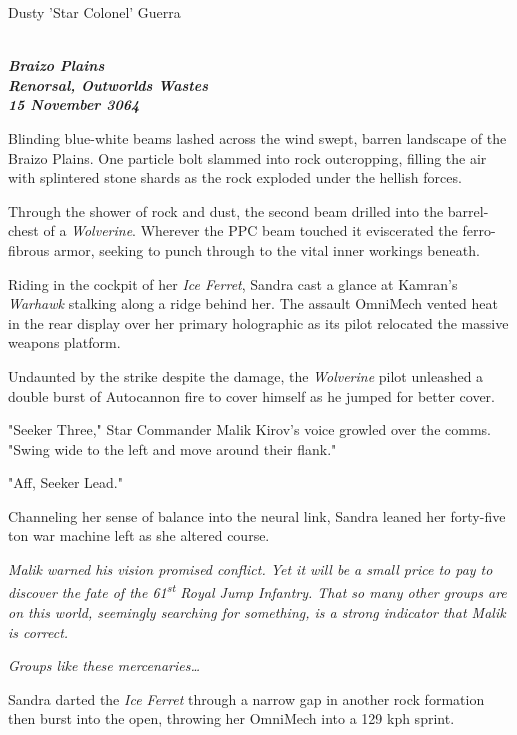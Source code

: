 \begin{center}
Dusty 'Star Colonel' Guerra
\end{center}

\begin{multicols}{2}

\emph{
\bfseries
\\Braizo Plains\\
\noindent
Renorsal, Outworlds Wastes\\
15 November 3064
}

Blinding blue-white beams lashed across the wind swept, barren landscape of the Braizo Plains.
One particle bolt slammed into rock outcropping, filling the air with splintered stone shards as the rock exploded under the hellish forces.

Through the shower of rock and dust, the second beam drilled into the barrel-chest of a \emph{Wolverine}.
Wherever the PPC beam touched it eviscerated the ferro-fibrous armor, seeking to punch through to the vital inner workings beneath.

Riding in the cockpit of her \emph{Ice Ferret}, Sandra cast a glance at Kamran's \emph{Warhawk} stalking along a ridge behind her.
The assault OmniMech vented heat in the rear display over her primary holographic as its pilot relocated the massive weapons platform.

Undaunted by the strike despite the damage, the \emph{Wolverine} pilot unleashed a double burst of Autocannon fire to cover himself as he jumped for better cover.

"Seeker Three," Star Commander Malik Kirov's voice growled over the comms. "Swing wide to the left and move around their flank."

"Aff, Seeker Lead."

Channeling her sense of balance into the neural link, Sandra leaned her forty-five ton war machine left as she altered course.

\emph{
Malik warned his vision promised conflict.
Yet it will be a small price to pay to discover the fate of the 61\textsuperscript{st} Royal Jump Infantry.
That so many other groups are on this world, seemingly searching for something, is a strong indicator that Malik is correct.
}

\emph{
Groups like these mercenaries{\ldots}
}

Sandra darted the \emph{Ice Ferret} through a narrow gap in another rock formation then burst into the open, throwing her OmniMech into a 129 kph sprint. 


\end{multicols}
